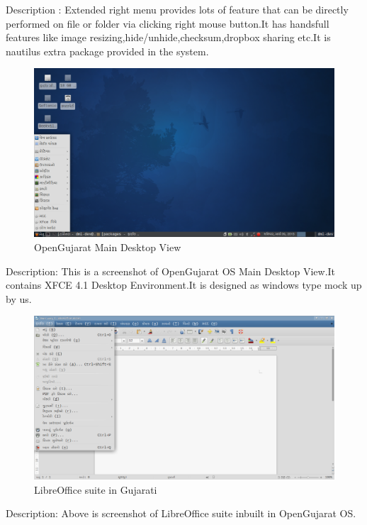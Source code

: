 Description : Extended right menu provides lots of feature that can be directly performed on file or folder via clicking right mouse button.It has handsfull features like image resizing,hide/unhide,checksum,dropbox sharing etc.It is nautilus extra package provided in the system.
\newpage
\begin{figure}[h]
\begin{center}
  \includegraphics[scale=0.33] {10.png}
  \caption[Screenshot - OpenGujarat Main Desktop]{OpenGujarat Main Desktop View}
\end{center}
\end{figure}
Description: This is a screenshot of OpenGujarat OS Main Desktop View.It contains XFCE 4.1 Desktop Environment.It is designed as windows type mock up by us.
\newpage


\begin{figure}[h]
\begin{center}
  \includegraphics[scale=0.33] {11.png}
  \caption[Screenshot - Office suite in Gujarati]{LibreOffice suite in Gujarati}
\end{center}
\end{figure}
Description: Above is screenshot of LibreOffice suite inbuilt in OpenGujarat OS.

